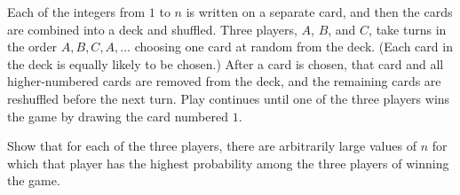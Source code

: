 Each of the integers from $1$ to $n$ is written on a separate card, and then the cards are combined into a deck and shuffled. Three players, $A$, $B$, and $C$, take turns in the order $A,B,C,A,\dots$ choosing one card at random from the deck. (Each card in the deck is equally likely to be chosen.) After a card is chosen, that card and all higher-numbered cards are removed from the deck, and the remaining cards are reshuffled before the next turn. Play continues until one of the three players wins the game by drawing the card numbered $1$.

Show that for each of the three players, there are arbitrarily large values of $n$ for which that player has the highest probability among the three players of winning the game. 
